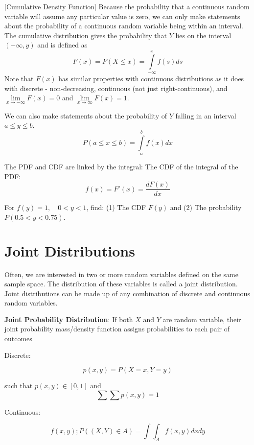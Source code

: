 \documentclass[]{book}
\theoremstyle{definition}
\theoremstyle{definition}
\theoremstyle{definition}
\theoremstyle{remark}
\begin{document}
[Cumulative Density Function]
\protect\hypertarget{def:unnamed-chunk-80}{}{\label{def:unnamed-chunk-80} {} }Because the probability that a continuous random variable will assume any particular value is zero, we can only make statements about the probability of a continuous random variable being within an interval. The cumulative distribution gives the probability that \(Y\) lies on the interval \((-\infty,y)\) and is defined as \[F(x)=P(X\le x)=\int\limits_{-\infty}^x f(s)ds\] Note that \(F(x)\) has similar properties with continuous distributions as it does with discrete - non-decreasing, continuous (not just right-continuous), and \(\lim\limits_{x \to -\infty} F(x) = 0\) and \(\lim\limits_{x \to \infty} F(x) = 1\).

We can also make statements about the probability of \(Y\) falling in an interval \(a\le y\le b\).
\[P(a\le x\le b)=\int\limits_a^b f(x)dx\]

The PDF and CDF are linked by the integral: The CDF of the integral of the PDF: \[f(x) = F'(x)=\frac{dF(x)}{dx}\]

\protect\hypertarget{exm:unnamed-chunk-81}{}{\label{exm:unnamed-chunk-81} }
For \(f(y)=1, \quad 0<y<1\), find: (1) The CDF \(F(y)\) and (2) The probability \(P(0.5<y<0.75)\).

\hypertarget{joint-distributions}{%
\section{Joint Distributions}\label{joint-distributions}}

Often, we are interested in two or more random variables defined on the same sample space. The distribution of these variables is called a joint distribution. Joint distributions can be made up of any combination of discrete and continuous random variables.

\textbf{Joint Probability Distribution}: If both \(X\) and \(Y\) are random variable, their joint probability mass/density function assigns probabilities to each pair of outcomes

Discrete:

\[p(x, y) = P(X = x, Y = y)\]

such that \(p(x,y) \in [0,1]\) and \[\sum\sum p(x,y) = 1\]

Continuous:

\[f(x,y);P((X,Y) \in A) = \int\!\!\!\int_A f(x,y)dx dy \]
\end{document}
